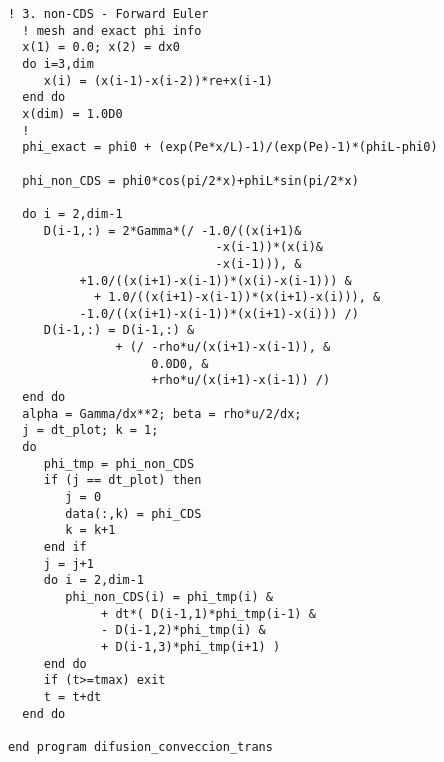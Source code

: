 \documentclass[9pt,technote,twoside,letterpaper,onecolumn]{IEEEtran}
\begin{document}
\begin{multicols}{2}
\begin{lstlisting}[caption={Algoritmo Forward-Euler, Runge-Kutta},label={lst:trans_alg}]
  ! 3. non-CDS - Forward Euler
  ! mesh and exact phi info
  x(1) = 0.0; x(2) = dx0
  do i=3,dim
     x(i) = (x(i-1)-x(i-2))*re+x(i-1)
  end do
  x(dim) = 1.0D0
  !
  phi_exact = phi0 + (exp(Pe*x/L)-1)/(exp(Pe)-1)*(phiL-phi0)

  phi_non_CDS = phi0*cos(pi/2*x)+phiL*sin(pi/2*x)

  do i = 2,dim-1
     D(i-1,:) = 2*Gamma*(/ -1.0/((x(i+1)&
                             -x(i-1))*(x(i)&
                             -x(i-1))), &
          +1.0/((x(i+1)-x(i-1))*(x(i)-x(i-1))) &
            + 1.0/((x(i+1)-x(i-1))*(x(i+1)-x(i))), &
          -1.0/((x(i+1)-x(i-1))*(x(i+1)-x(i))) /)
     D(i-1,:) = D(i-1,:) &
               + (/ -rho*u/(x(i+1)-x(i-1)), &
                    0.0D0, &
                    +rho*u/(x(i+1)-x(i-1)) /)
  end do
  alpha = Gamma/dx**2; beta = rho*u/2/dx;
  j = dt_plot; k = 1;
  do
     phi_tmp = phi_non_CDS
     if (j == dt_plot) then
        j = 0
        data(:,k) = phi_CDS
        k = k+1
     end if
     j = j+1
     do i = 2,dim-1
        phi_non_CDS(i) = phi_tmp(i) &
             + dt*( D(i-1,1)*phi_tmp(i-1) &
             - D(i-1,2)*phi_tmp(i) &
             + D(i-1,3)*phi_tmp(i+1) ) 
     end do
     if (t>=tmax) exit
     t = t+dt
  end do

end program difusion_conveccion_trans
\end{lstlisting}
\end{multicols}
\end{document}
